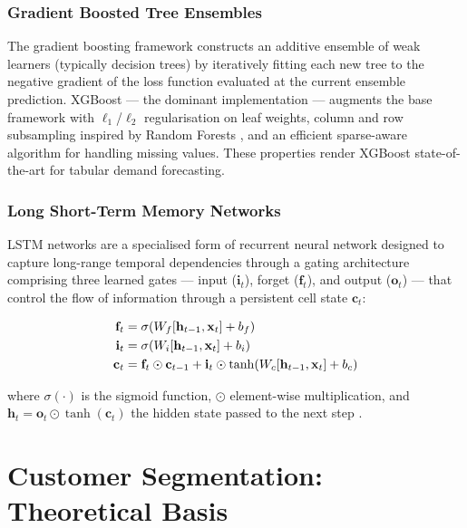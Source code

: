 \subsubsection{Gradient Boosted Tree Ensembles}

The gradient boosting framework \cite{Goodfellow2016} constructs an additive ensemble of weak learners (typically decision trees) by iteratively fitting each new tree to the negative gradient of the loss function evaluated at the current ensemble prediction. XGBoost \cite{ChenGuestrin2016} — the dominant implementation — augments the base framework with $\ell_1$/$\ell_2$ regularisation on leaf weights, column and row subsampling inspired by Random Forests \cite{Breiman2001}, and an efficient sparse-aware algorithm for handling missing values. These properties render XGBoost state-of-the-art for tabular demand forecasting.

\subsubsection{Long Short-Term Memory Networks}

LSTM networks \cite{Hochreiter1997} are a specialised form of recurrent neural network designed to capture long-range temporal dependencies through a gating architecture comprising three learned gates — input ($\mathbf{i}_t$), forget ($\mathbf{f}_t$), and output ($\mathbf{o}_t$) — that control the flow of information through a persistent cell state $\mathbf{c}_t$:

\begin{align}
    \mathbf{f}_t &= \sigma(W_f [\mathbf{h}_{t-1}, \mathbf{x}_t] + b_f) \notag \\
    \mathbf{i}_t &= \sigma(W_i [\mathbf{h}_{t-1}, \mathbf{x}_t] + b_i) \notag \\
    \mathbf{c}_t &= \mathbf{f}_t \odot \mathbf{c}_{t-1} + \mathbf{i}_t \odot \tanh(W_c [\mathbf{h}_{t-1}, \mathbf{x}_t] + b_c)
    \label{eq:lstm}
\end{align}

where $\sigma(\cdot)$ is the sigmoid function, $\odot$ element-wise multiplication, and $\mathbf{h}_t = \mathbf{o}_t \odot \tanh(\mathbf{c}_t)$ the hidden state passed to the next step \cite{goodfellow_bengio_courville_2016}.

\section{Customer Segmentation: Theoretical Basis}

